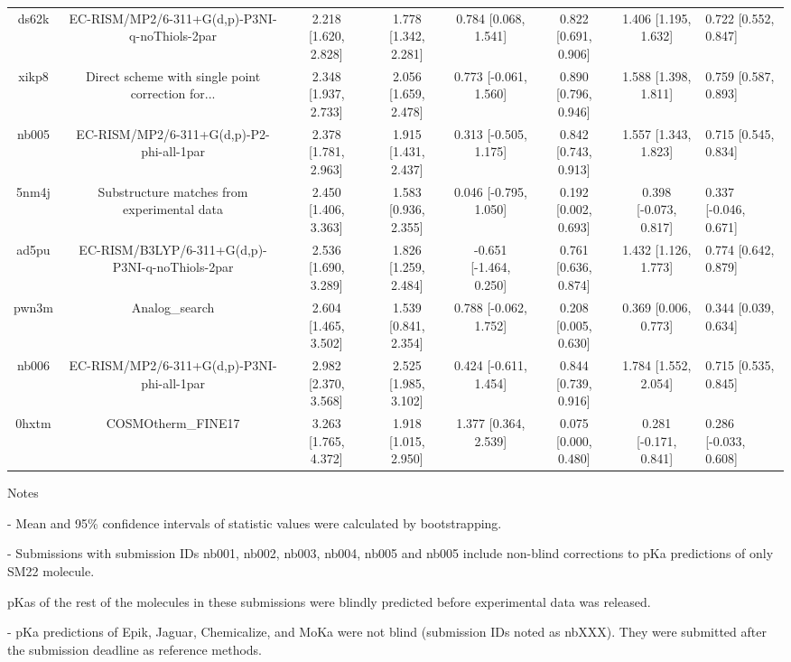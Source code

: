 \documentclass{article}
\begin{document}
\begin{center}
\begin{longtable}{|ccccccc|}
 ds62k &      EC-RISM/MP2/6-311+G(d,p)-P3NI-q-noThiols-2par &  2.218 [1.620, 2.828] &  1.778 [1.342, 2.281] &     0.784 [0.068, 1.541] &  0.822 [0.691, 0.906] &   1.406 [1.195, 1.632] &   0.722 [0.552, 0.847] \\
 xikp8 &  Direct scheme with single point correction for... &  2.348 [1.937, 2.733] &  2.056 [1.659, 2.478] &    0.773 [-0.061, 1.560] &  0.890 [0.796, 0.946] &   1.588 [1.398, 1.811] &   0.759 [0.587, 0.893] \\
 nb005 &           EC-RISM/MP2/6-311+G(d,p)-P2-phi-all-1par &  2.378 [1.781, 2.963] &  1.915 [1.431, 2.437] &    0.313 [-0.505, 1.175] &  0.842 [0.743, 0.913] &   1.557 [1.343, 1.823] &   0.715 [0.545, 0.834] \\
 5nm4j &        Substructure matches from experimental data &  2.450 [1.406, 3.363] &  1.583 [0.936, 2.355] &    0.046 [-0.795, 1.050] &  0.192 [0.002, 0.693] &  0.398 [-0.073, 0.817] &  0.337 [-0.046, 0.671] \\
 ad5pu &    EC-RISM/B3LYP/6-311+G(d,p)-P3NI-q-noThiols-2par &  2.536 [1.690, 3.289] &  1.826 [1.259, 2.484] &   -0.651 [-1.464, 0.250] &  0.761 [0.636, 0.874] &   1.432 [1.126, 1.773] &   0.774 [0.642, 0.879] \\
 pwn3m &                                     Analog\_search &  2.604 [1.465, 3.502] &  1.539 [0.841, 2.354] &    0.788 [-0.062, 1.752] &  0.208 [0.005, 0.630] &   0.369 [0.006, 0.773] &   0.344 [0.039, 0.634] \\
 nb006 &         EC-RISM/MP2/6-311+G(d,p)-P3NI-phi-all-1par &  2.982 [2.370, 3.568] &  2.525 [1.985, 3.102] &    0.424 [-0.611, 1.454] &  0.844 [0.739, 0.916] &   1.784 [1.552, 2.054] &   0.715 [0.535, 0.845] \\
 0hxtm &                                 COSMOtherm\_FINE17 &  3.263 [1.765, 4.372] &  1.918 [1.015, 2.950] &     1.377 [0.364, 2.539] &  0.075 [0.000, 0.480] &  0.281 [-0.171, 0.841] &  0.286 [-0.033, 0.608] \\
\end{longtable}
\end{center}

Notes

- Mean and 95\% confidence intervals of statistic values were calculated by bootstrapping.

- Submissions with submission IDs nb001, nb002, nb003, nb004, nb005 and nb005 include non-blind corrections to pKa predictions of only SM22 molecule.

pKas of the rest of the molecules in these submissions were blindly predicted before experimental data was released.

- pKa predictions of Epik, Jaguar, Chemicalize, and MoKa were not blind (submission IDs noted as nbXXX). They were submitted after the submission deadline as reference methods.
\end{document}
